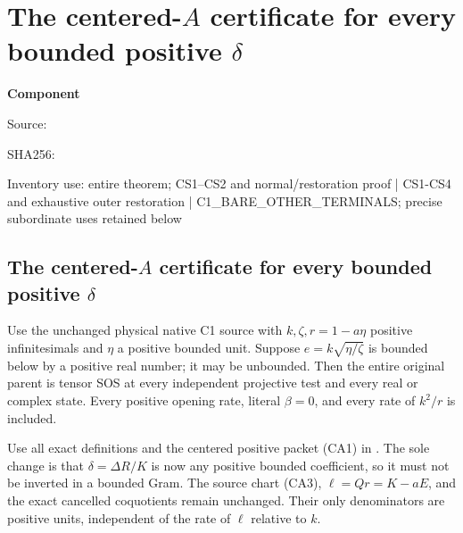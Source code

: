 \chapter{The centered-$A$ certificate for every bounded positive $\delta$}
\label{component:pccaa793fd0bf}
\noindent\textbf{Component }\par
{\small\noindent Source: \par}
{\small\noindent SHA256: \par}
{\small\noindent Inventory use: entire theorem; CS1--CS2 and normal/restoration proof | CS1-CS4 and exhaustive outer restoration | C1\_\allowbreak{}BARE\_\allowbreak{}OTHER\_\allowbreak{}TERMINALS; precise subordinate uses retained below\par}
\medskip
\section[The centered-A certificate for every bounded positive delta]{The centered-$A$ certificate for every bounded positive $\delta$}

\begin{theorem}
Use the unchanged physical native C1 source with $k,\zeta,r=1-a\eta$
positive infinitesimals and $\eta$ a positive bounded unit. Suppose
$e=k\sqrt{\eta/\zeta}$ is bounded below by a positive real number;
it may be unbounded. Then the entire original parent is tensor SOS at
every independent projective test and every real or complex state.
Every positive opening rate, literal $\beta=0$, and every rate of
$k^2/r$ is included.
\end{theorem}

Use all exact definitions and the centered positive packet (CA1) in
. The sole change is that
$\delta=\Delta R/K$ is now any positive bounded coefficient, so it
must not be inverted in a bounded Gram. The source chart (CA3),
$\ell=Qr=K-aE$, and the exact cancelled coquotients remain unchanged.
Their only denominators are positive units, independent of the rate
of $\ell$ relative to $k$.


